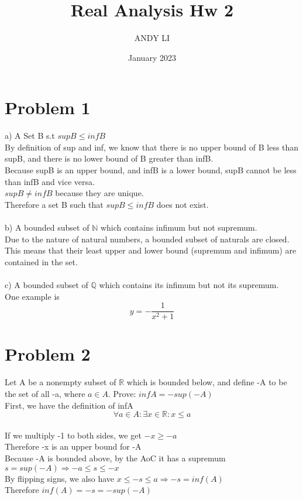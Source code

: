 \documentclass{article}
\title{Real Analysis Hw 2}
\author{ANDY LI}
\date{January 2023}
\begin{document}
\maketitle

\section*{Problem 1}
a) A Set B s.t $supB \leq infB$
\\By definition of sup and inf, we know that there is no upper bound of B less than supB, and there is no lower bound of B greater than infB.
\\Because supB is an upper bound, and infB is a lower bound, supB cannot be less than infB and vice versa.
\\$supB \neq infB$ because they are unique.
\\Therefore a set B such that $supB \leq infB$ does not exist.
\\
\\b) A bounded subset of $\mathbb{N}$ which contains infimum but not supremum.
\\Due to the nature of natural numbers, a bounded subset of naturals are closed. This means that their least upper and lower bound (supremum and infimum) are contained in the set.
\\
\\c) A bounded subset of $\mathbb{Q}$ which contains its infimum but not its supremum.
\\One example is $$y = -\frac{1}{x^2+1}$$

\section*{Problem 2}
Let A be a nonempty subset of $\mathbb{R}$ which is bounded below, and define -A to be the set of all -a, where $a \in A$. Prove: $infA = -sup(-A)$
\\First, we have the definition of infA $$\forall a \in A : \exists x \in \mathbb{R} : x \leq a$$
\\If we multiply -1 to both sides, we get $-x \geq -a$
\\Therefore -x is an upper bound for -A
\\Because -A is bounded above, by the AoC it has a supremum $s = sup(-A) \Rightarrow -a \leq s \leq -x$
\\By flipping signs, we also have $x \leq -s \leq a \Rightarrow -s = inf(A)$
\\Therefore $inf(A) = -s = -sup(-A)$
\end{document}
